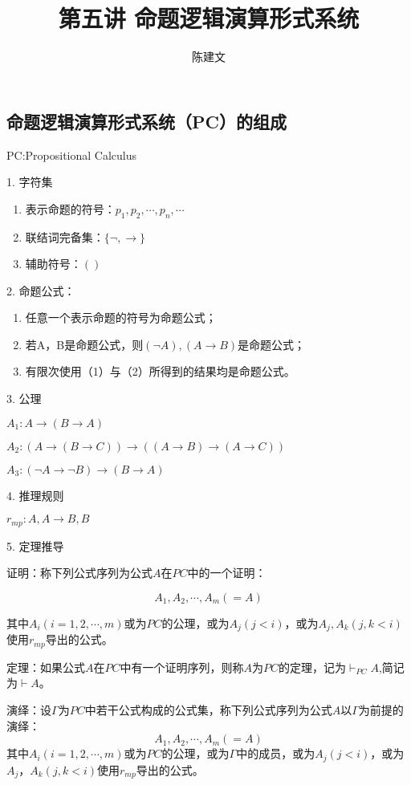 \documentclass{article}
\begin{document}
\begin{CJK*}{UTF8}{gbsn}
  \title{第五讲 命题逻辑演算形式系统}
  \author{陈建文}
  \maketitle
  \section{命题逻辑演算形式系统（PC）的组成}

  PC:Propositional Calculus

    1. 字符集
    \begin{enumerate}
      \item 表示命题的符号：$p_1,p_2,\cdots,p_n,\cdots$
      \item 联结词完备集：$\{\lnot, \to\}$
      \item 辅助符号：$()$
    \end{enumerate}
   
    2. 命题公式：
    \begin{enumerate}
      \item 任意一个表示命题的符号为命题公式；
      \item 若A，B是命题公式，则$(\lnot A), (A\to B)$是命题公式；
      \item 有限次使用（1）与（2）所得到的结果均是命题公式。
    \end{enumerate}

    3. 公理  
  
    $A_1:A\to(B\to A)$

    $A_2:(A\to(B\to C))\to((A\to B)\to (A\to C))$

    $A_3:(\lnot A\to \lnot B)\to (B \to A)$

    4. 推理规则 
    
    $r_{mp}:A,A\to B, B$

    5. 定理推导
    

    证明：称下列公式序列为公式$A$在$PC$中的一个证明：

    \[A_1,A_2,\cdots,A_m(=A)\]

    其中$A_i(i=1,2,\cdots,m)$或为$PC$的公理，或为$A_j(j<i)$，或为$A_j,A_k(j,k<i)$使用$r_{mp}$导出的公式。


    定理：如果公式$A$在$PC$中有一个证明序列，则称$A$为$PC$的定理，记为$\vdash_{PC}A$,简记为$\vdash A$。


    演绎：设$\Gamma$为$PC$中若干公式构成的公式集，称下列公式序列为公式$A$以$\Gamma$为前提的演绎：
    \[A_1,A_2,\cdots, A_m(=A)\]
    其中$A_i(i=1,2,\cdots,m)$或为$PC$的公理，或为$\Gamma$中的成员，或为$A_j(j<i)$，或为$A_j$，$A_k(j,k<i)$使用$r_{mp}$导出的公式。



\end{CJK*}
\end{document}
